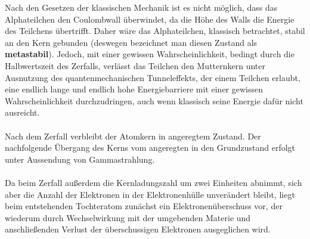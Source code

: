 \documentclass[a4paper,titlepage]{scrartcl}
\numberwithin{equation}{section}
\begin{document}
Nach den Gesetzen der klassischen Mechanik ist es nicht möglich, dass das Alphateilchen den Coulombwall überwindet, da die Höhe des Walls die Energie des Teilchens übertrifft. Daher wäre das Alphateilchen, klassisch betrachtet, stabil an den Kern gebunden (deswegen bezeichnet man diesen Zustand als \textbf{metastabil}). Jedoch, mit einer gewissen Wahrscheinlichkeit, bedingt durch die Halbwertszeit des Zerfalls, verlässt das Teilchen den Mutternkern unter Ausnutzung des quantenmechanischen Tunneleffekts, der einem Teilchen erlaubt, eine endlich lange und endlich hohe Energiebarriere mit einer gewissen Wahrscheinlichkeit durchzudringen, auch wenn klassisch seine Energie dafür nicht ausreicht.\\ \\
Nach dem Zerfall verbleibt der Atomkern in angeregtem Zustand. Der nachfolgende Übergang des Kerns vom angeregten in den Grundzustand erfolgt unter Aussendung von Gammastrahlung.\\ \\
Da beim Zerfall außerdem die Kernladungszahl um zwei Einheiten abnimmt, sich aber die Anzahl der Elektronen in der Elektronenhülle unverändert bleibt, liegt beim entstehenden Tochteratom zunächst ein Elektronenüberschuss vor, der wiederum durch Wechselwirkung mit der umgebenden Materie und anschließenden Verlust der überschussigen Elektronen ausgeglichen wird.
\end{document}
